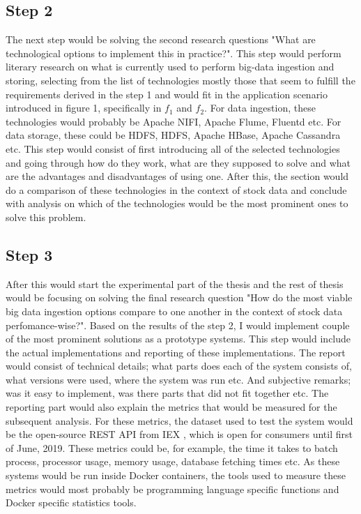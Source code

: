 \documentclass[article,11pt]{article}
\begin{document}
\subsection*{Step 2}

The next step would be solving the second research questions "What are technological options to implement this in practice?".
This step would perform literary research on what is currently used to perform big-data ingestion and storing, selecting from the list of technologies mostly those that seem to fulfill the requirements derived in the step 1 and would fit in the application scenario introduced in figure 1, specifically in $f_1$ and $f_2$.
For data ingestion, these technologies would probably be Apache NIFI, Apache Flume, Fluentd etc. 
For data storage, these could be HDFS, HDFS, Apache HBase, Apache Cassandra etc.
This step would consist of first introducing all of the selected technologies and going through how do they work, what are they supposed to solve and what are the advantages and disadvantages of using one.
After this, the section would do a comparison of these technologies in the context of stock data and conclude with analysis on which of the technologies would be the most prominent ones to solve this problem.

\subsection*{Step 3}

After this would start the experimental part of the thesis and the rest of thesis would be focusing on solving the final research question "How do the most viable big data ingestion options compare to one another in the context of stock data perfomance-wise?".
Based on the results of the step 2, I would implement couple of the most prominent solutions as a prototype systems.
This step would include the actual implementations and reporting of these implementations.
The report would consist of technical details; what parts does each of the system consists of, what versions were used, where the system was run etc. And subjective remarks; was it easy to implement, was there parts that did not fit together etc. 
The reporting part would also explain the metrics that would be measured for the subsequent analysis.
For these metrics, the dataset used to test the system would be the open-source REST API from IEX \cite{iex}, which is open for consumers until first of June, 2019.
These metrics could be, for example, the time it takes to batch process, processor usage, memory usage, database fetching times etc. 
As these systems would be run inside Docker containers, the tools used to measure these metrics would most probably be programming language specific functions and Docker specific statistics tools. 
\end{document}

